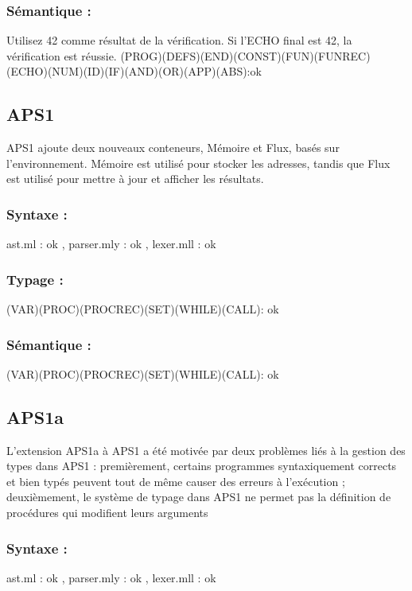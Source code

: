 \documentclass{article}
\begin{document}
	\subsubsection*{Sémantique :}
	Utilisez 42 comme résultat de la vérification. Si l'ECHO final est 42, la vérification est réussie.
	\newline \newline
	(PROG)(DEFS)(END)(CONST)(FUN)(FUNREC)(ECHO)(NUM)(ID)(IF)(AND)(OR)(APP)(ABS):ok
	
		\subsection*{APS1}
	APS1 ajoute deux nouveaux conteneurs, Mémoire et Flux, basés sur l'environnement. Mémoire est utilisé pour stocker les adresses, tandis que Flux est utilisé pour mettre à jour et afficher les résultats.
	
	\subsubsection*{Syntaxe :}
	ast.ml : ok , parser.mly : ok , lexer.mll : ok
	
	\subsubsection*{Typage :} 
	(VAR)(PROC)(PROCREC)(SET)(WHILE)(CALL): ok
	
	\subsubsection*{Sémantique :}
	(VAR)(PROC)(PROCREC)(SET)(WHILE)(CALL): ok
	
	\subsection*{APS1a}

	L'extension APS1a à APS1 a été motivée par deux problèmes liés à la gestion des types dans APS1 : premièrement, certains programmes syntaxiquement corrects et bien typés peuvent tout de même causer des erreurs à l'exécution ; deuxièmement, le système de typage dans APS1 ne permet pas la définition de procédures qui modifient leurs arguments
	
	\subsubsection*{Syntaxe :}
	ast.ml : ok , parser.mly : ok , lexer.mll : ok
	
\end{document}
